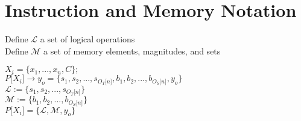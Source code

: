 \documentclass[11pt]{article}
\begin{document}






\section{Instruction and Memory Notation}
Define $\mathcal{L}$ a set of logical operations\\
Define $\mathcal{M}$ a set of memory elements, magnitudes, and sets
\begin{center}
$
X_i = \{x_1,...,x_n,C\};
$
\\ \vspace{2mm}
$
P \lbrack X_i \rbrack \rightarrow y_o = \{ s_1,s_2,...,s_{O_T \lbrack n \rbrack }, b_1, b_2,...,b_{O_S \lbrack n \rbrack},y_o \}
$
\\ \vspace{2mm}
$
\mathcal{L} := \{ s_1,s_2,...,s_{O_T \lbrack n \rbrack}\}
$
\\ \vspace{2mm}
$
\mathcal{M} := \{ b_1,b_2,...,b_{O_S \lbrack n \rbrack}\}
$
\\ \vspace{2mm}
$
P \lbrack X_i \rbrack = \{ \mathcal{L},\mathcal{M},y_o\}
$
\end{center}
\end{document}
